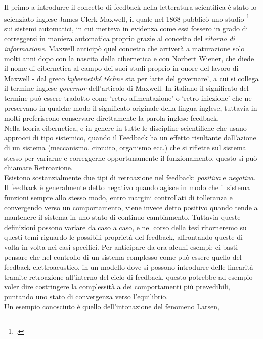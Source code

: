 Il primo a introdurre il concetto di feedback nella letteratura scientifica 
è stato lo scienziato inglese James Clerk Maxwell, 
il quale nel 1868 pubblicò uno studio \footcite{maxwellongovernor}
sui sistemi automatici, in cui metteva in evidenza come essi fossero in grado di correggersi
in maniera automatica proprio grazie al concetto del \textit{ritorno di informazione}.
Maxwell anticipò quel concetto che arriverà a maturazione solo molti anni dopo con 
la nascita della cibernetica e con Norbert Wiener, che diede il nome di cibernetica al campo dei suoi studi proprio in onore del lavoro di Maxwell - dal greco \textit{kybernetiké téchne} sta per ‘arte del governare’, a cui si collega il termine inglese \textit{governor} dell'articolo di Maxwell.
In italiano il significato del termine può essere tradotto come ‘retro-alimentazione’
o ‘retro-iniezione’ che ne preservano in qualche modo il significato originale della lingua inglese,
tuttavia in molti preferiscono conservare direttamente la parola inglese feedback. \\
Nella teoria cibernetica, e in genere in tutte le discipline scientifiche che usano approcci di tipo sistemico, quando il Feedback ha un effetto risultante dall’azione di un sistema (meccanismo, circuito, organismo ecc.) che si riflette sul sistema stesso per variarne e correggerne opportunamente il funzionamento, questo si può chiamare Retroazione. \\
Esistono sostanzialmente due tipi di retroazione nel feedback: \textit{positiva} e \textit{negativa}.
Il feedback è generalmente detto negativo quando agisce in modo che il sistema funzioni sempre allo stesso modo, entro margini controllati di tolleranza e convergendo verso un comportamento, viene invece detto positivo quando tende a mantenere il sistema in uno stato di continuo cambiamento.
Tuttavia queste definizioni possono variare da caso a caso, 
e nel corso della tesi ritorneremo su questi temi
riguardo le possibili proprietà del feedback, affrontando queste di volta in volta
nei casi specifici.
Per anticipare da ora alcuni esempi: 
ci basti pensare che nel controllo di un sistema complesso
come può essere quello del feedback elettroacustico,
in un modello dove si possono introdurre delle linearità 
tramite retroazione all'interno del ciclo di
feedback, questo potrebbe ad esempio voler dire costringere la complessità
a dei comportamenti più prevedibili, 
puntando uno stato di convergenza verso l'equilibrio. \\
Un esempio conosciuto è quello dell'intonazione del fenomeno Larsen,
